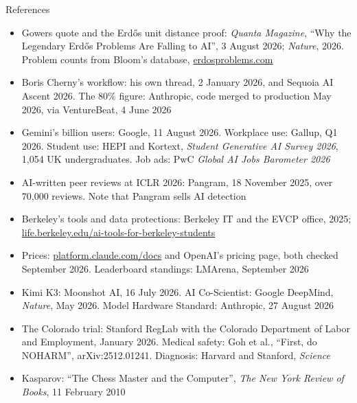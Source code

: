 \documentclass[aspectratio=169]{beamer}
\begin{document}
\begin{frame}{References}
    \scriptsize
    \begin{itemize}\setlength{\itemsep}{2.5pt}
        \item Gowers quote and the Erd\H{o}s unit distance proof: \textit{Quanta Magazine},
              ``Why the Legendary Erd\H{o}s Problems Are Falling to AI'', 3 August 2026;
              \textit{Nature}, 2026. Problem counts from Bloom's database, \url{erdosproblems.com}
        \item Boris Cherny's workflow: his own thread, 2 January 2026, and Sequoia AI Ascent 2026.
              The 80\% figure: Anthropic, code merged to production May 2026, via VentureBeat,
              4 June 2026
        \item Gemini's billion users: Google, 11 August 2026. Workplace use: Gallup, Q1 2026.
              Student use: HEPI and Kortext, \textit{Student Generative AI Survey 2026},
              1,054 UK undergraduates. Job ads: PwC \textit{Global AI Jobs Barometer 2026}
        \item AI-written peer reviews at ICLR 2026: Pangram, 18 November 2025, over 70,000
              reviews. Note that Pangram sells AI detection
        \item Berkeley's tools and data protections: Berkeley IT and the EVCP office, 2025;
              \url{life.berkeley.edu/ai-tools-for-berkeley-students}
        \item Prices: \url{platform.claude.com/docs} and OpenAI's pricing page, both checked
              September 2026. Leaderboard standings: LMArena, September 2026
        \item Kimi K3: Moonshot AI, 16 July 2026. AI Co-Scientist: Google DeepMind,
              \textit{Nature}, May 2026. Model Hardware Standard: Anthropic, 27 August 2026
        \item The Colorado trial: Stanford RegLab with the Colorado Department of Labor and
              Employment, January 2026. Medical safety: Goh et al., ``First, do NOHARM'',
              arXiv:2512.01241. Diagnosis: Harvard and Stanford, \textit{Science}
        \item Kasparov: ``The Chess Master and the Computer'', \textit{The New York Review of
              Books}, 11 February 2010
    \end{itemize}
\end{frame}
\end{document}
